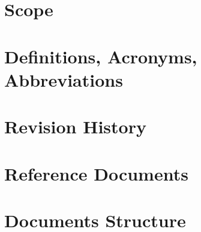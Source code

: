 \section{Scope}

\section{Definitions, Acronyms, Abbreviations}

\section{Revision History}

\section{Reference Documents}

\section{Documents Structure}